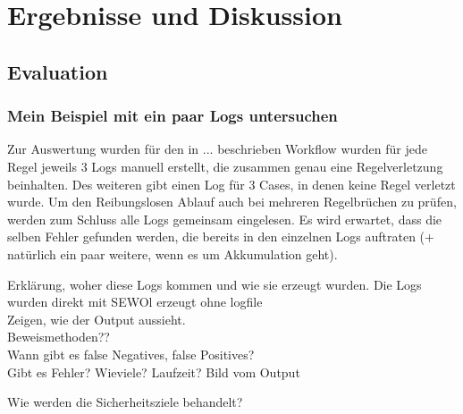 
\chapter{Ergebnisse und Diskussion} %

\label{Chapter5} %


\section{Evaluation}
\subsection{Mein Beispiel mit ein paar Logs untersuchen}
Zur Auswertung wurden für den in ... beschrieben Workflow wurden für jede Regel jeweils 3 Logs manuell erstellt, die zusammen genau eine Regelverletzung beinhalten. Des weiteren gibt einen Log für 3 Cases, in denen keine Regel verletzt wurde. Um den Reibungslosen Ablauf auch bei mehreren Regelbrüchen zu prüfen, werden zum Schluss alle Logs gemeinsam eingelesen. Es wird erwartet, dass die selben Fehler gefunden werden, die bereits in den einzelnen Logs auftraten (+ natürlich ein paar weitere, wenn es um Akkumulation geht).



Erklärung, woher diese Logs kommen und wie sie erzeugt wurden. Die Logs wurden direkt mit SEWOl erzeugt ohne logfile\\
Zeigen, wie der Output aussieht.\\
Beweismethoden??\\
Wann gibt es false Negatives, false Positives?\\
Gibt es Fehler? Wieviele? 
Laufzeit?
Bild vom Output

Wie werden die Sicherheitsziele behandelt?



